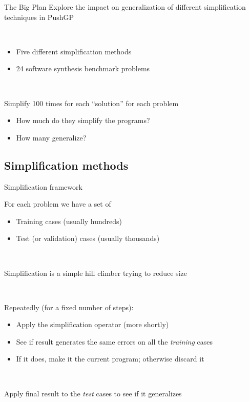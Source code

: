 \documentclass{beamer}
\begin{document}
\begin{frame}{The Big Plan}
Explore the impact on generalization of different simplification techniques in PushGP 

~

\begin{itemize}
	\item Five different simplification methods
	\item 24 software synthesis benchmark problems
\end{itemize}

~ 

Simplify 100 times for each ``solution'' for each problem
\begin{itemize}
	\item How much do they simplify the programs?
	\item How many generalize?
\end{itemize} 

\end{frame}

\subsection{Simplification methods}

\begin{frame}{Simplification framework}

For each problem we have a set of
\begin{itemize}
	\item Training cases (usually hundreds)
	\item Test (or validation) cases (usually thousands)
\end{itemize}

~

Simplification is a simple hill climber trying to reduce size

~

Repeatedly (for a fixed number of steps):
\begin{itemize}
	\item Apply the simplification operator (more shortly)
	\item See if result generates the same errors on all the \emph{training} cases
	\item If it does, make it the current program; otherwise discard it
\end{itemize}


~

Apply final result to the \emph{test} cases to see if it generalizes

\end{frame}
\end{document}
